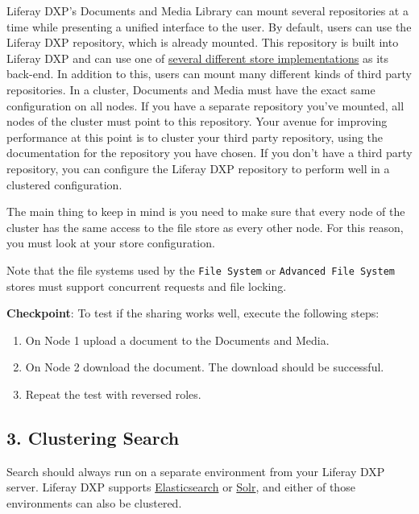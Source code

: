 Liferay DXP's Documents and Media Library can mount several repositories
at a time while presenting a unified interface to the user. By default,
users can use the Liferay DXP repository, which is already mounted. This
repository is built into Liferay DXP and can use one of
\href{/docs/7-0/deploy/-/knowledge_base/d/document-repository-configuration}{several
different store implementations} as its back-end. In addition to this,
users can mount many different kinds of third party repositories. In a
cluster, Documents and Media must have the exact same configuration on
all nodes. If you have a separate repository you've mounted, all nodes
of the cluster must point to this repository. Your avenue for improving
performance at this point is to cluster your third party repository,
using the documentation for the repository you have chosen. If you don't
have a third party repository, you can configure the Liferay DXP
repository to perform well in a clustered configuration.

The main thing to keep in mind is you need to make sure that every node
of the cluster has the same access to the file store as every other
node. For this reason, you must look at your store configuration.

Note that the file systems used by the \texttt{File\ System} or
\texttt{Advanced\ File\ System} stores must support concurrent requests
and file locking.

\noindent\hrulefill

\textbf{Checkpoint}: To test if the sharing works well, execute the
following steps:

\begin{enumerate}
\def\labelenumi{\arabic{enumi}.}
\tightlist
\item
  On Node 1 upload a document to the Documents and Media.
\item
  On Node 2 download the document. The download should be successful.
\item
  Repeat the test with reversed roles.
\end{enumerate}

\noindent\hrulefill

\subsection{3. Clustering Search}\label{clustering-search}

Search should always run on a separate environment from your Liferay DXP
server. Liferay DXP supports
\href{/docs/7-0/deploy/-/knowledge_base/d/configuring-elasticsearch-for-liferay-0}{Elasticsearch}
or \href{/docs/7-0/deploy/-/knowledge_base/d/using-solr}{Solr}, and
either of those environments can also be clustered.

